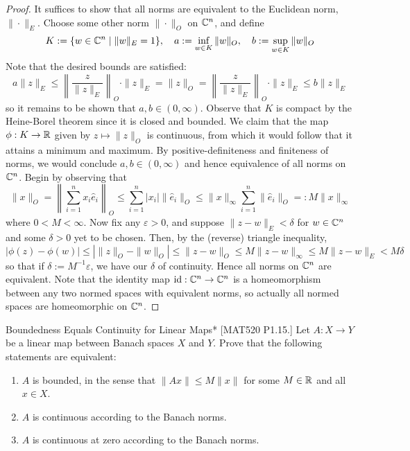 \begin{proof}
    It suffices to show that all norms are equivalent to the Euclidean norm, \(\|\cdot\|_E\). Choose some other norm \(\|\cdot\|_O\) on \(\mathbb{C}^n\), and define 
    \[
        K := \{w \in \mathbb{C}^n \mid \|w\|_E = 1\}, \quad 
        a := \inf_{w \in K} \|w\|_O, \quad 
        b := \sup_{w \in K} \|w\|_O
    \]
    Note that the desired bounds are satisfied:
    \[
        a \|z\|_E 
        \leq \left\|\frac{z}{\|z\|_E}\right\|_O \cdot \|z\|_E
        = \|z\|_O
        = \left\|\frac{z}{\|z\|_E}\right\|_O \cdot \|z\|_E
        \leq b \|z\|_E
    \]
    so it remains to be shown that \(a, b \in (0, \infty)\). Observe that \(K\) is compact by the Heine-Borel theorem since it is closed and bounded. We claim that the map \(\phi : K \to \mathbb{R}\) given by \(z \mapsto \|z\|_O\) is continuous, from which it would follow that it attains a minimum and maximum. By positive-definiteness and finiteness of norms, we would conclude \(a, b \in (0, \infty)\) and hence equivalence of all norms on \(\mathbb{C}^n\). Begin by observing that 
    \[
        \|x\|_O = \left\| \sum_{i=1}^n x_i \hat{e}_i \right\|_O 
        \leq \sum_{i=1}^n |x_i| \|\hat{e}_i\|_O 
        \leq \|x\|_\infty \sum_{i=1}^n \|\hat{e}_i\|_O 
        =: M\|x\|_\infty
    \]
    where \(0 < M < \infty\). Now fix any \(\varepsilon > 0\), and suppose \(\|z - w\|_E < \delta\) for \(w \in \mathbb{C}^n\) and some \(\delta > 0\) yet to be chosen. Then, by the (reverse) triangle inequality, 
    \[
        |\phi(z) - \phi(w)|
        \leq \left| \|z\|_O - \|w\|_O \right|
        \leq \|z - w\|_O 
        \leq M \|z - w\|_\infty
        \leq M \|z - w\|_E 
        < M \delta 
    \]
    so that if \(\delta := M^{-1} \varepsilon\), we have our \(\delta\) of continuity. Hence all norms on \(\mathbb{C}^n\) are equivalent. Note that the identity map \(\operatorname{id} : \mathbb{C}^n \to \mathbb{C}^n\) is a homeomorphism between any two normed spaces with equivalent norms, so actually all normed spaces are homeomorphic on \(\mathbb{C}^n\). 
\end{proof}

\begin{problem}{Boundedness Equals Continuity for Linear Maps}*
    [MAT520 P1.15.] Let \(A : X \to Y\) be a linear map between Banach spaces \(X\) and \(Y\). Prove that the following statements are equivalent: 
    \begin{enumerate}
        \itemsep0em
        \item \(A\) is bounded, in the sense that \(\|Ax\| \leq M\|x\|\) for some \(M \in \mathbb{R}\) and all \(x \in X\). 
        \item \(A\) is continuous according to the Banach norms. 
        \item \(A\) is continuous at zero according to the Banach norms. 
    \end{enumerate}
\end{problem}


